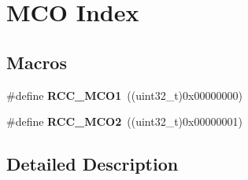 \hypertarget{group___r_c_c___m_c_o___index}{}\section{M\+CO Index}
\label{group___r_c_c___m_c_o___index}
\subsection*{Macros}
\begin{DoxyCompactItemize}
\item 
\#define {\bfseries R\+C\+C\+\_\+\+M\+C\+O1}~((uint32\+\_\+t)0x00000000)\hypertarget{group___r_c_c___m_c_o___index_ga152dd1ae9455e528526c4e23a817937b}{}\label{group___r_c_c___m_c_o___index_ga152dd1ae9455e528526c4e23a817937b}

\item 
\#define {\bfseries R\+C\+C\+\_\+\+M\+C\+O2}~((uint32\+\_\+t)0x00000001)\hypertarget{group___r_c_c___m_c_o___index_ga248f59fc2868f83bea4f2d182edcdf4c}{}\label{group___r_c_c___m_c_o___index_ga248f59fc2868f83bea4f2d182edcdf4c}

\end{DoxyCompactItemize}


\subsection{Detailed Description}

